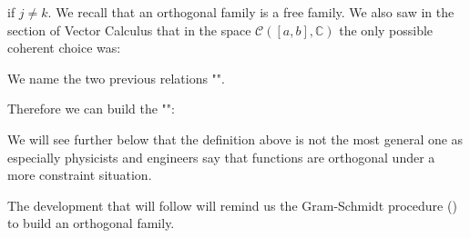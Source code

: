 	if $j \ne k$. We recall that an orthogonal family is a free family. We also saw in the section of Vector Calculus that in the space $\mathcal{C}([a,b],\mathbb{C})$ the only possible coherent choice was:
	
	
	We name the two previous relations "".
	
	Therefore we can build the "":
	
	\begin{tcolorbox}[title=Remark,colframe=black,arc=10pt]
	We will see further below that the definition above is not the most general one as especially physicists and engineers say that functions are orthogonal under a more constraint situation.
	\end{tcolorbox}
	The development that will follow will remind us the Gram-Schmidt procedure () to build an orthogonal family.
	
